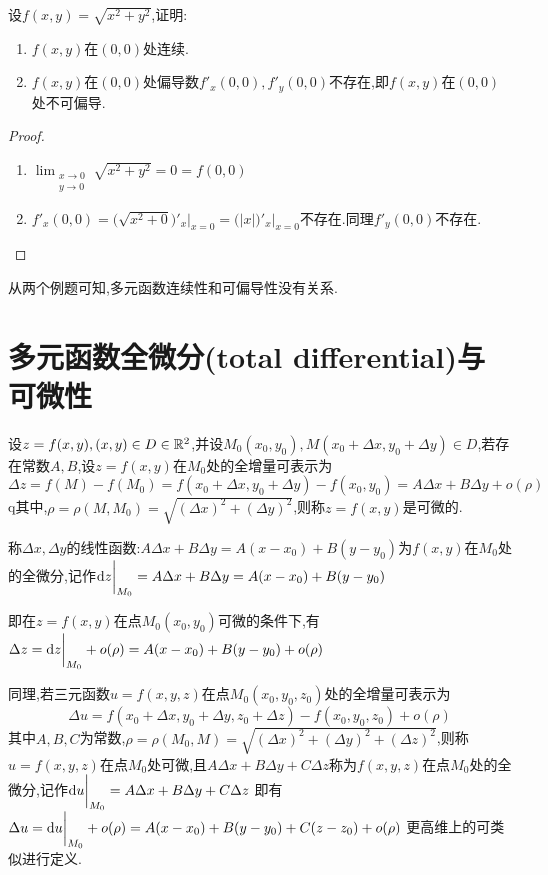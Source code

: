 \begin{example}
    设$f(x,y)=\sqrt{x^2+y^2}$,证明:\begin{enumerate}
        \item $f(x,y)$在$(0,0)$处连续.
        \item $f(x,y)$在$(0,0)$处偏导数$f'_x(0,0),f'_y(0,0)$不存在,即$f(x,y)$在$(0,0)$处不可偏导.
    \end{enumerate}
\end{example}
\begin{proof}
    \begin{enumerate}
        \item $\lim_{\substack{x\to0\\y\to0}}\sqrt{x^2+y^2}=0=f(0,0)$
        \item $f'_x(0,0)=\big(\sqrt{x^2+0}\big)'_x\bigg|_{x=0}=\big(|x|\big)'_x\bigg|_{x=0}$不存在.同理$f'_y(0,0)$不存在.
    \end{enumerate}
\end{proof}
从两个例题可知,多元函数连续性和可偏导性没有关系.

\section{多元函数全微分(total differential)与可微性}
\begin{definition}
    设$z=f(x,y),(x,y)\in D\in \mathbb{R}^2$,并设$M_0(x_0,y_0),M(x_0+\Delta x,y_0+\Delta y)\in D $,若存在常数$A,B$,设$z=f(x,y)$在$M_0$处的全增量可表示为$$\Delta z=f(M)-f(M_0)=f(x_0+\Delta x ,y_0+\Delta y)-f(x_0,y_0)=A\Delta x+B\Delta y+o(\rho)$$q其中,$\rho=\rho(M,M_0)=\sqrt{(\Delta x)^2+(\Delta y)^2}$,则称$z=f(x,y)$是可微的.
    
    称$\Delta x,\Delta y$的线性函数:$A\Delta x+B\Delta y=A(x-x_0)+B(y-y_0)$为$f(x,y)$在$M_0$处的全微分,记作$\operatorname{d\!}{}z\bigg|_{M_0}=A\Delta x+B\Delta y=A(x-x_0)+B(y-y_0)$

    即在$z=f(x,y)$在点$M_0(x_0,y_0)$可微的条件下,有$\Delta z=\operatorname{d\!}{z}\bigg|_{M_0}+o(\rho)=A(x-x_0)+B(y-y_0)+o(\rho)$
\end{definition}

同理,若三元函数$u=f(x,y,z)$在点$M_0(x_0,y_0,z_0)$处的全增量可表示为
$$\Delta u=f(x_0+\Delta x,y_0+\Delta y,z_0+\Delta z)-f(x_0,y_0,z_0)+o(\rho)$$
其中$A,B,C$为常数,$\rho=\rho(M_0,M)=\sqrt{(\Delta x)^2+(\Delta y)^2+(\Delta z)^2}$,则称$u=f(x,y,z)$在点$M_0$处可微,且$A\Delta x+B\Delta y+C\Delta z$称为$f(x,y,z)$在点$M_0$处的全微分,记作$\operatorname{d\!}{}u\bigg|_{M_0}=A\Delta x+B\Delta y+C\Delta z$
即有
$\Delta u=\operatorname{d\!}{}u\bigg|_{M_0}+o(\rho)=A(x-x_0)+B(y-y_0)+C(z-z_0)+o(\rho)$
更高维上的可类似进行定义.

